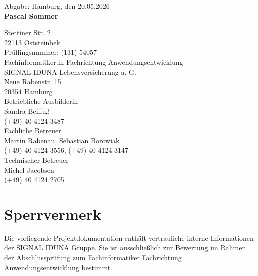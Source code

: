 \documentclass[
  10pt,
  ngerman,
  a4paper,
  toc=graduated,
  numbers=noenddot,
  headings=standardclasses,
  nonumberlist
]{scrartcl}
\begin{document}
\vspace{1.5cm}
\begin{center}
	Abgabe: Hamburg, den 20.05.2026\\[3\baselineskip]
	\textbf{\textcolor{ihk_blue}{Pascal Sommer}}

    Stettiner Str. 2 \\
    22113 Oststeinbek \\
    Prüflingsnummer: (131)-54057 \\
    Fachinformatiker:in Fachrichtung Anwendungsentwicklung \\[4\baselineskip]

    SIGNAL IDUNA Lebensversicherung a. G. \\
    Neue Rabenstr. 15 \\
    20354 Hamburg \\[2\baselineskip]
	
	Betriebliche Ausbilderin \\
    Sandra Beilfuß \\
    (+49) 40 4124 3487 \\[2\baselineskip]

    Fachliche Betreuer \\
    Martin Rabenau, Sebastian Borowiak \\
    (+49) 40 4124 3556, (+49) 40 4124 3147 \\[2\baselineskip]

    Technischer Betreuer \\
    Michel Jacobsen \\
    (+49) 40 4124 2705 \\

\end{center}


\newpage
\hypersetup{pageanchor=true}
\renewcommand{\thepage}{\Roman{page}}
\tableofcontents{}

\newpage
\cleardoublepage{}
{}

\section*{Sperrvermerk}

Die vorliegende Projektdokumentation enthält vertrauliche interne Informationen der SIGNAL IDUNA Gruppe. Sie ist ausschließlich zur Bewertung im Rahmen der Abschlussprüfung zum Fachinformatiker Fachrichtung Anwendungsentwicklung bestimmt.
\end{document}
